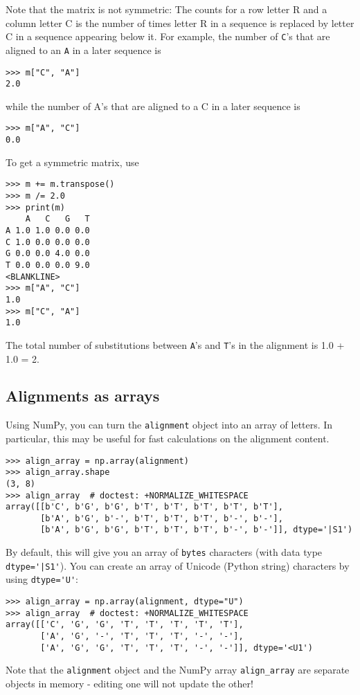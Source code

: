 Note that the matrix is not symmetric: The counts for a row letter R and a column letter C is the number of times letter R in a sequence is replaced by letter C in a sequence appearing below it. For example, the number of \verb|C|'s that are aligned to an \verb|A| in a later sequence is
\begin{verbatim}
>>> m["C", "A"]
2.0
\end{verbatim}
while the number of A's that are aligned to a C in a later sequence is
\begin{verbatim}
>>> m["A", "C"]
0.0
\end{verbatim}
To get a symmetric matrix, use
\begin{verbatim}
>>> m += m.transpose()
>>> m /= 2.0
>>> print(m)
    A   C   G   T
A 1.0 1.0 0.0 0.0
C 1.0 0.0 0.0 0.0
G 0.0 0.0 4.0 0.0
T 0.0 0.0 0.0 9.0
<BLANKLINE>
>>> m["A", "C"]
1.0
>>> m["C", "A"]
1.0
\end{verbatim}
The total number of substitutions between \verb|A|'s and \verb|T|'s in the alignment is 1.0 + 1.0 = 2.

\subsection{Alignments as arrays}

Using NumPy, you can turn the \verb+alignment+ object into an array of letters. In particular, this may be useful for fast calculations on the alignment content.
\begin{verbatim}
>>> align_array = np.array(alignment)
>>> align_array.shape
(3, 8)
>>> align_array  # doctest: +NORMALIZE_WHITESPACE
array([[b'C', b'G', b'G', b'T', b'T', b'T', b'T', b'T'],
       [b'A', b'G', b'-', b'T', b'T', b'T', b'-', b'-'],
       [b'A', b'G', b'G', b'T', b'T', b'T', b'-', b'-']], dtype='|S1')
\end{verbatim}
By default, this will give you an array of \verb|bytes| characters (with data type \verb+dtype='|S1'+). You can create an array of Unicode (Python string) characters by using \verb+dtype='U'+:
\begin{verbatim}
>>> align_array = np.array(alignment, dtype="U")
>>> align_array  # doctest: +NORMALIZE_WHITESPACE
array([['C', 'G', 'G', 'T', 'T', 'T', 'T', 'T'],
       ['A', 'G', '-', 'T', 'T', 'T', '-', '-'],
       ['A', 'G', 'G', 'T', 'T', 'T', '-', '-']], dtype='<U1')
\end{verbatim}
Note that the \verb+alignment+ object and the NumPy array \verb|align_array| are separate objects in memory - editing one will not update the other!

